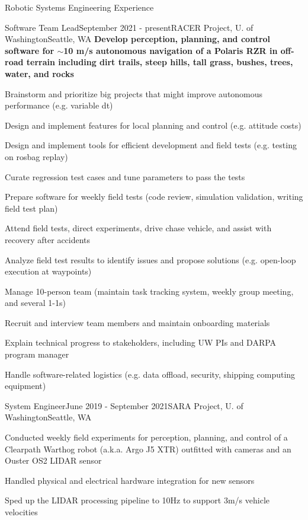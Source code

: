 \documentclass{resume} %
\begin{document}
\begin{rSection}{Robotic Systems Engineering Experience}

\begin{rSubsection}{Software Team Lead}{September 2021 - present}{RACER Project, U. of Washington}{Seattle, WA}
{\bf\small Develop perception, planning, and control software for $\sim$10 m/s autonomous navigation of a Polaris RZR in off-road terrain including dirt trails, steep hills, tall grass, bushes, trees, water, and rocks}
\item Brainstorm and prioritize big projects that might improve autonomous performance (e.g. variable dt)
\item Design and implement features for local planning and control (e.g. attitude costs)
\item Design and implement tools for efficient development and field tests (e.g. testing on rosbag replay)
\item Curate regression test cases and tune parameters to pass the tests
\item Prepare software for weekly field tests (code review, simulation validation, writing field test plan)
\item Attend field tests, direct experiments, drive chase vehicle, and assist with recovery after accidents
\item Analyze field test results to identify issues and propose solutions (e.g. open-loop execution at waypoints)
\item Manage 10-person team (maintain task tracking system, weekly group meeting, and several 1-1s)
\item Recruit and interview team members and maintain onboarding materials
\item Explain technical progress to stakeholders, including UW PIs and DARPA program manager
\item Handle software-related logistics (e.g. data offload, security, shipping computing equipment)
\end{rSubsection}

\begin{rSubsection}{System Engineer}{June 2019 - September 2021}{SARA Project, U. of Washington}{Seattle, WA}
\item Conducted weekly field experiments for perception, planning, and control of a Clearpath Warthog robot (a.k.a. Argo J5 XTR) outfitted with cameras and an Ouster OS2 LIDAR sensor
\item Handled physical and electrical hardware integration for new sensors
\item Sped up the LIDAR processing pipeline to 10Hz to support 3m/s vehicle velocities
\end{rSubsection}


\end{rSection}
\end{document}
